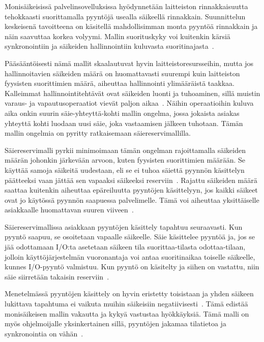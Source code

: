 \documentclass[finnish]{tktltiki2}
\theoremstyle{definition}
\theoremstyle{remark}
\begin{document}
Monisäikeisissä palvelinsovelluksissa hyödynnetään laitteiston
rinnakkaisuutta tehokkaasti suorittamalla pyyntöjä usealla säikeellä rinnakkain.
Suunnittelun keskeisenä tavoitteena on käsitellä mahdollisimman monta pyyntöä rinnakkain ja
näin saavuttaa korkea volyymi. Mallin suorituskyky voi kuitenkin
kärsiä synkronointiin ja säikeiden hallinnointiin kuluvasta
suoritinajasta~\cite{pyarali_proactor_1997}.

Pääsääntöisesti nämä mallit skaalautuvat hyvin laitteistoresursseihin,
mutta jos hallinnoitavien säikeiden määrä on huomattavasti suurempi kuin laitteiston
fyysisten suorittimien määrä, aiheuttaa hallinnointi ylimääräistä taakkaa.
Kalleimmat hallinnointitehtävät ovat säikeiden luonti ja tuhoaminen, sillä
muistin varaus- ja vapautusoperaatiot vievät paljon aikaa~\cite{ling_analysis_2000}.
Näihin operaatioihin kuluva aika onkin suurin säie-yhteyttä-kohti mallin
ongelma, jossa jokaista asiakas yhteyttä kohti
luodaan uusi säie, joka vastaamisen jälkeen tuhotaan.
Tämän mallin ongelmia on pyritty ratkaisemaan säiereservimallilla.

Säiereservimalli pyrkii minimoimaan tämän ongelman rajoittamalla
säikeiden määrän johonkin järkevään arvoon, kuten fyysisten suorittimien
määrään. Se käyttää samoja säikeitä uudestaan, eli se ei tuhoa säiettä
pyynnön käsittelyn päätteeksi vaan jättää sen vapaaksi säikeeksi reserviin~\cite{ling_analysis_2000}. Rajattu säikeiden määrä saattaa kuitenkin aiheuttaa epäreiluutta
pyyntöjen käsittelyyn, jos kaikki säikeet ovat jo käytössä pyynnön 
saapuessa palvelimelle. Tämä voi aiheuttaa yksittäiselle asiakkaalle
huomattavan suuren viiveen~\cite{welsh_seda_2001}.

Säiereservimallissa asiakkaan pyyntöjen käsittely tapahtuu seuraavasti.
Kun pyyntö saapuu, se osoitetaan vapaalle säikeelle. Säie käsittelee pyyntöä ja,
jos se jää odottamaan I/O:ta asetetaan säikeen tila suorittaa-tilasta odottaa-tilaan,
jolloin käyttöjärjestelmän vuoronantaja voi antaa suoritinaikaa toiselle säikeelle,
kunnes I/O-pyyntö valmistuu. Kun pyyntö on käsitelty ja siihen on vastattu, niin
säie siirretään takaisin reserviin~\cite{ling_analysis_2000}.

Menetelmässä pyyntöjen käsittely on hyvin eristetty toisistaan ja
yhden säikeen lukittava tapahtuma ei vaikuta muihin säikeisiin negatiivisesti~\cite{davis_case_2017}.
Tämä edistää monisäikeisen mallin vakautta ja kykyä vastustaa hyökkäyksiä.
Tämä malli on myös ohjelmoijalle yksinkertainen sillä, pyyntöjen jakamaa tilatietoa
ja synkronointia on vähän~\cite{hu_applying_1998}.
\end{document}
